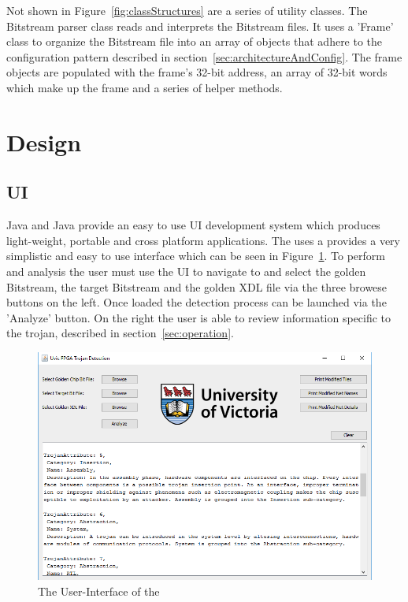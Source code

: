 Not shown in Figure~\ref{fig:classStructures} are a series of utility classes.
The \gls{Bitstream} parser class reads and interprets the \gls{Bitstream} files. 
It uses a 'Frame' class to organize the \gls{Bitstream} file into an array of objects that adhere to the configuration pattern described in section~\ref{sec:architectureAndConfig}.
The frame objects are populated with the frame's 32-bit address, an array of 32-bit words which make up the frame and a series of helper methods.
\section{Design}
\subsection{\acrfull{UI}}
Java and Java \Swing provide an easy to use \acrlong{UI} development system which produces light-weight, portable and cross platform applications.
The \NameNoPeriod uses a provides a very simplistic and easy to use interface which can be seen in Figure~\ref{fig:UI}.
To perform and analysis the user must use the \acrshort{UI} to navigate to and select the \gls{golden} \gls{Bitstream}, the \gls{target} \gls{Bitstream} and the \gls{golden} \acrshort{XDL} file via the three browese buttons on the left.
Once loaded the detection process can be launched via the 'Analyze' button.
On the right the user is able to review information specific to the trojan, described in section~\ref{sec:operation}.
\begin{figure}
\centering
\includegraphics[width=0.96\linewidth]{Figures/UI}
\caption[The User-Interface of the \NameNoPeriod]{The User-Interface of the \NameNoPeriod}
\label{fig:UI}
\end{figure}

